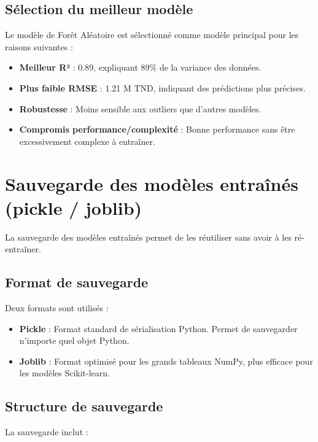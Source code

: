\subsection{Sélection du meilleur modèle}

Le modèle de Forêt Aléatoire est sélectionné comme modèle principal pour les raisons suivantes :

\begin{itemize}
    \item \textbf{Meilleur R²} : 0.89, expliquant 89\% de la variance des données.
    \item \textbf{Plus faible RMSE} : 1.21 M TND, indiquant des prédictions plus précises.
    \item \textbf{Robustesse} : Moins sensible aux outliers que d'autres modèles.
    \item \textbf{Compromis performance/complexité} : Bonne performance sans être excessivement complexe à entraîner.
\end{itemize}

\section{Sauvegarde des modèles entraînés (pickle / joblib)}
\label{sec:sprint5-save}

La sauvegarde des modèles entraînés permet de les réutiliser sans avoir à les ré-entraîner.

\subsection{Format de sauvegarde}

Deux formats sont utilisés :

\begin{itemize}
    \item \textbf{Pickle} : Format standard de sérialisation Python. Permet de sauvegarder n'importe quel objet Python.
    \item \textbf{Joblib} : Format optimisé pour les grands tableaux NumPy, plus efficace pour les modèles Scikit-learn.
\end{itemize}

\subsection{Structure de sauvegarde}

La sauvegarde inclut :

